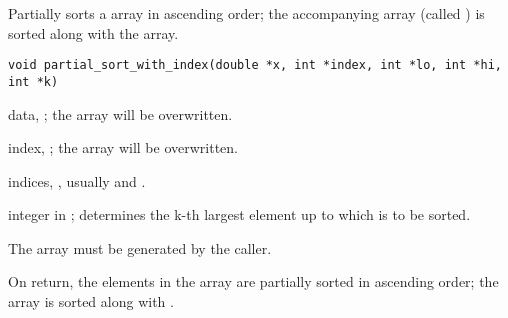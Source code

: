 \documentclass[a4paper,oneside,10pt,DIV=12]{scrreprt}
\begin{document}
\begin{Description}
Partially sorts a  array in ascending order; the accompanying
 array (called ) is sorted along with the array.
\end{Description}
\begin{Usage}
\begin{verbatim}
void partial_sort_with_index(double *x, int *index, int *lo, int *hi, int *k)
\end{verbatim}
\end{Usage}
\begin{Arguments}
	\begin{ldescription}
		\item[\code{x}] data, ; the array will be
			overwritten.
		\item[\code{index}] index, ; the array will be
			overwritten. 
		\item[\code{lo, hi}] indices, \code{[int]}, usually  and
			.  
		\item[\code{k}] integer in ; determines the k-th largest
			element up to  which  is to be sorted.
	\end{ldescription}
\end{Arguments}
\begin{Details}
	The array  must be generated by the caller.
\end{Details}
\begin{Value}
On return, the elements  in the array  are partially
sorted in ascending order; the array  is sorted along with
.
\end{Value}
\end{document}
